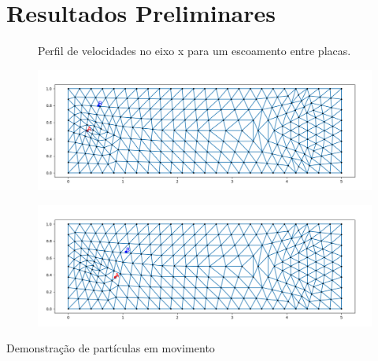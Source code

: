 \documentclass{beamer}
\begin{document}
\section{Resultados Preliminares}

\begin{frame}
  \begin{figure}
     {\raggedleft \tiny Perfil de velocidades no eixo x para um escoamento entre placas.}
  \end{figure}
  
  \begin{minipage}{.49\textwidth}
    \begin{figure}
      \includegraphics[width=\linewidth]{figure/particles_results_0.png}
    \end{figure}
  \end{minipage}
  \begin{minipage}{.49\textwidth}
    \begin{figure}
      \includegraphics[width=\linewidth]{figure/particles_results_1.png}
    \end{figure}
  \end{minipage}
  
  \tiny{Demonstração de partículas em movimento}
\end{frame}
\end{document}

